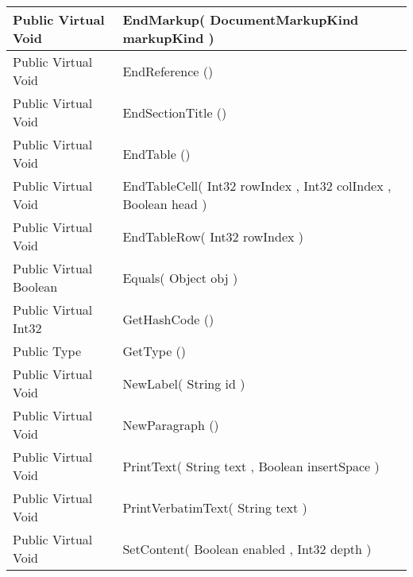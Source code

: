 \documentclass[11pt, oneside, a4paper]{book}
\begin{document}
\begin{center}
\begin{tabular}{| p{3cm} | p{12cm} | }
\hline
 Public  Virtual  Void &  EndMarkup(\hypertarget{SoftwareEngineeringTools.{}Documentation.{}WordGenerator.{}EndMarkup\_DocumentMarkupKind}{} DocumentMarkupKind  markupKind  )\\
\hline
 Public  Virtual  Void &  EndReference ()\hypertarget{SoftwareEngineeringTools.{}Documentation.{}WordGenerator.{}EndReference}{}\\
\hline
 Public  Virtual  Void &  EndSectionTitle ()\hypertarget{SoftwareEngineeringTools.{}Documentation.{}WordGenerator.{}EndSectionTitle}{}\\
\hline
 Public  Virtual  Void &  EndTable ()\hypertarget{SoftwareEngineeringTools.{}Documentation.{}WordGenerator.{}EndTable}{}\\
\hline
 Public  Virtual  Void &  EndTableCell(\hypertarget{SoftwareEngineeringTools.{}Documentation.{}WordGenerator.{}EndTableCell\_Int32\_Int32\_Boolean}{} Int32  rowIndex  ,  Int32  colIndex  ,  Boolean  head  )\\
\hline
 Public  Virtual  Void &  EndTableRow(\hypertarget{SoftwareEngineeringTools.{}Documentation.{}WordGenerator.{}EndTableRow\_Int32}{} Int32  rowIndex  )\\
\hline
 Public  Virtual  Boolean &  Equals(\hypertarget{SoftwareEngineeringTools.{}Documentation.{}WordGenerator.{}Equals\_Object}{} Object  obj  )\\
\hline
 Public  Virtual  Int32 &  GetHashCode ()\hypertarget{SoftwareEngineeringTools.{}Documentation.{}WordGenerator.{}GetHashCode}{}\\
\hline
 Public  Type &  GetType ()\hypertarget{SoftwareEngineeringTools.{}Documentation.{}WordGenerator.{}GetType}{}\\
\hline
 Public  Virtual  Void &  NewLabel(\hypertarget{SoftwareEngineeringTools.{}Documentation.{}WordGenerator.{}NewLabel\_String}{} String  id  )\\
\hline
 Public  Virtual  Void &  NewParagraph ()\hypertarget{SoftwareEngineeringTools.{}Documentation.{}WordGenerator.{}NewParagraph}{}\\
\hline
 Public  Virtual  Void &  PrintText(\hypertarget{SoftwareEngineeringTools.{}Documentation.{}WordGenerator.{}PrintText\_String\_Boolean}{} String  text  ,  Boolean  insertSpace  )\\
\hline
 Public  Virtual  Void &  PrintVerbatimText(\hypertarget{SoftwareEngineeringTools.{}Documentation.{}WordGenerator.{}PrintVerbatimText\_String}{} String  text  )\\
\hline
 Public  Virtual  Void &  SetContent(\hypertarget{SoftwareEngineeringTools.{}Documentation.{}WordGenerator.{}SetContent\_Boolean\_Int32}{} Boolean  enabled  ,  Int32  depth  )\\

\end{tabular}
\end{center}
\end{document}
